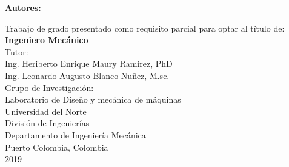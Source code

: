 \thispagestyle{empty}
\begin{center}
        \Large{ \textbf{ \uppercase{\TitleProject} } }
\end{center}
\vspace{2cm}
\begin{center}
    \large 
    \textbf{Autores:} \\
        \textbf{\AuthorProject}
\end{center}
\vspace{2cm}
\begin{center}
    Trabajo de grado presentado como requisito parcial para optar al título de:\\
    \textbf{Ingeniero Mecánico} \\
    \vspace{1cm}
    Tutor: \\
    Ing. Heriberto Enrique Maury Ramirez, PhD\\
    Ing. Leonardo Augusto Blanco Nuñez, M.sc.\\
    \vspace{1cm}
    Grupo de Investigación:\\
    Laboratorio de Diseño y mecánica de máquinas\\
    \vfill
    Universidad del Norte\\
    División de Ingenierías\\
    Departamento de Ingeniería Mecánica\\
    Puerto Colombia, Colombia\\
    2019
\end{center}